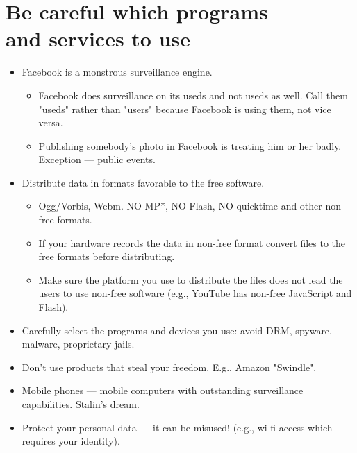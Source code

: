 \documentclass[twoside,openright]{report}
\begin{document}
\section[Be careful which programs and services to use]{Be careful which programs\\ and services to use }
\begin{itemize}
 \item    Facebook is a monstrous surveillance engine.
\begin{itemize}
 \item        Facebook does surveillance on its useds and not useds as well. Call them "useds" rather than "users" because Facebook is using them, not vice versa.
 \item        Publishing somebody's photo in Facebook is treating him or her badly. Exception --- public events.
\end{itemize}
  \item   Distribute data in formats favorable to the free software.
\begin{itemize}
 \item        Ogg/Vorbis, Webm. NO MP*, NO Flash, NO quicktime and other non-free formats.   
 \item        If your hardware records the data in non-free format convert files to the free formats before distributing.
 \item        Make sure the platform you use to distribute the files does not lead the users to use non-free software (e.g., YouTube has non-free JavaScript and Flash). 
\end{itemize}
  \item   Carefully select the programs and devices you use: avoid DRM, spyware, malware, proprietary jails.
  \item   Don't use products that steal your freedom. E.g., Amazon "Swindle".
 \item    Mobile phones --- mobile computers with outstanding surveillance capabilities. Stalin's dream.
 \item    Protect your personal data --- it can be misused! (e.g., wi-fi access which requires your identity).
\end{itemize}
\end{document}
